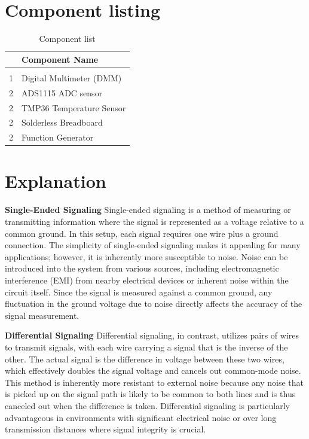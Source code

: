 \documentclass[a4paper,11pt]{article}%
\begin{document}
\section{Component listing}


\begin{table}[H]
	\centering 
	\begin{tabular}{|c|l|}
		\hline
		&\textbf{Component Name}\\\hline
		
		&\\
		1&Digital Multimeter (DMM)\\
		2&ADS1115 ADC sensor\\
		2&TMP36 Temperature Sensor\\
		2&Solderless Breadboard\\
		2&Function Generator \\
\hline\hline
	\end{tabular}
	\caption{Component list}
	\label{filterspecs}
\end{table}





\section{Explanation}


\textbf{Single-Ended Signaling}
Single-ended signaling is a method of measuring or transmitting information where the signal is represented as a voltage relative to a common ground. In this setup, each signal requires one wire plus a ground connection. The simplicity of single-ended signaling makes it appealing for many applications; however, it is inherently more susceptible to noise. Noise can be introduced into the system from various sources, including electromagnetic interference (EMI) from nearby electrical devices or inherent noise within the circuit itself. Since the signal is measured against a common ground, any fluctuation in the ground voltage due to noise directly affects the accuracy of the signal measurement.

\textbf{Differential Signaling}
Differential signaling, in contrast, utilizes pairs of wires to transmit signals, with each wire carrying a signal that is the inverse of the other. The actual signal is the difference in voltage between these two wires, which effectively doubles the signal voltage and cancels out common-mode noise. This method is inherently more resistant to external noise because any noise that is picked up on the signal path is likely to be common to both lines and is thus canceled out when the difference is taken. Differential signaling is particularly advantageous in environments with significant electrical noise or over long transmission distances where signal integrity is crucial.
\end{document}
